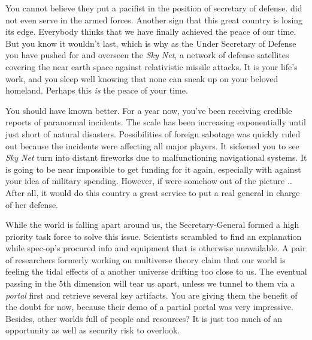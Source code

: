\documentclass[char]{guildcamp3}
\begin{document}
\name{\cPoliTwo{}}




You cannot believe they put a pacifist in the position of secretary of defense. \cPoliOne{\intro} did not even serve in the armed forces. Another sign that this great country is losing its edge. Everybody thinks that we have finally achieved the peace of our time. But you know it wouldn't last, which is why as the Under Secretary of Defense you have pushed for and overseen the \emph{Sky Net}, a network of defense satellites covering the near earth space against relativistic missile attacks. It is your life's work, and you sleep well knowing that none can sneak up on your beloved homeland. Perhaps this \emph{is} the peace of your time. 

You should have known better. For a year now, you've been receiving credible reports of paranormal incidents. The scale has been increasing exponentially until just short of natural disasters. Possibilities of foreign sabotage was quickly ruled out because the incidents were affecting all major players. It sickened you to see \emph{Sky Net} turn into distant fireworks due to malfunctioning navigational systems. It is going to be near impossible to get funding for it again, especially with \cPoliOne{} against your idea of military spending. However, if \cPoliOne{} were somehow out of the picture \ldots  After all, it would do this country a great service to put a real general in charge of her defense.

While the world is falling apart around us, the Secretary-General formed a high priority task force to solve this issue. Scientists scrambled to find an explanation while spec-op's procured info and equipment that is otherwise unavailable. A pair of researchers formerly working on multiverse theory claim that our world is feeling the tidal effects of a another universe drifting too close to us. The eventual passing in the 5th dimension will tear us apart, unless we tunnel to them via a \emph{portal} first and retrieve several key artifacts. You are giving them the benefit of the doubt for now, because their demo of a partial portal was very impressive. Besides, other worlds full of people and resources? It is just too much of an opportunity as well as security risk to overlook. 
\end{document}

